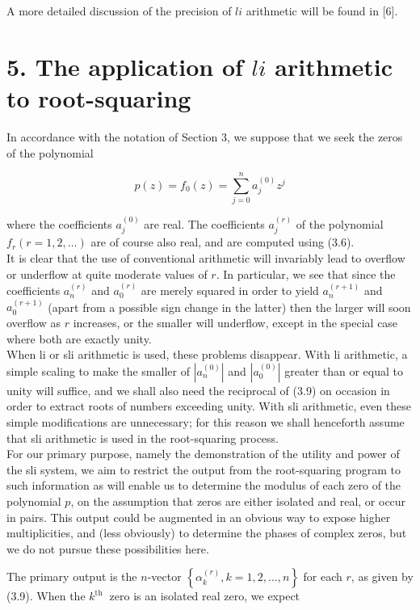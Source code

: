 \documentclass[10pt]{article}
\begin{document}
A more detailed discussion of the precision of $l i$ arithmetic will be found in [6].

\section*{5. The application of $l i$ arithmetic to root-squaring}
In accordance with the notation of Section 3, we suppose that we seek the zeros of the polynomial


\begin{equation*}
p(z)=f_{0}(z)=\sum_{j=0}^{n} a_{j}^{(0)} z^{j} \tag{5.1}
\end{equation*}


where the coefficients $a_{j}^{(0)}$ are real. The coefficients $a_{j}^{(r)}$ of the polynomial $f_{r} (r=1,2, \ldots)$ are of course also real, and are computed using (3.6).\\
It is clear that the use of conventional arithmetic will invariably lead to overflow or underflow at quite moderate values of $r$. In particular, we see that since the coefficients $a_{n}^{(r)}$ and $a_{0}^{(r)}$ are merely squared in order to yield $a_{n}^{(r+1)}$ and $a_{0}^{(r+1)}$ (apart from a possible sign change in the latter) then the larger will soon overflow as $r$ increases, or the smaller will underflow, except in the special case where both are exactly unity.\\
When li or sli arithmetic is used, these problems disappear. With li arithmetic, a simple scaling to make the smaller of $\left|a_{n}^{(0)}\right|$ and $\left|a_{0}^{(0)}\right|$ greater than or equal to unity will suffice, and we shall also need the reciprocal of (3.9) on occasion in order to extract roots of numbers exceeding unity. With sli arithmetic, even these simple modifications are unnecessary; for this reason we shall henceforth assume that sli arithmetic is used in the root-squaring process.\\
For our primary purpose, namely the demonstration of the utility and power of the sli system, we aim to restrict the output from the root-squaring program to such information as will enable us to determine the modulus of each zero of the polynomial $p$, on the assumption that zeros are either isolated and real, or occur in pairs. This output could be augmented in an obvious way to expose higher multiplicities, and (less obviously) to determine the phases of complex zeros, but we do not pursue these possibilities here.

The primary output is the $n$-vector $\left\{\alpha_{k}^{(r)}, k=1,2, \ldots, n\right\}$ for each $r$, as given by (3.9). When the $k^{\text {th }}$ zero is an isolated real zero, we expect
\end{document}
